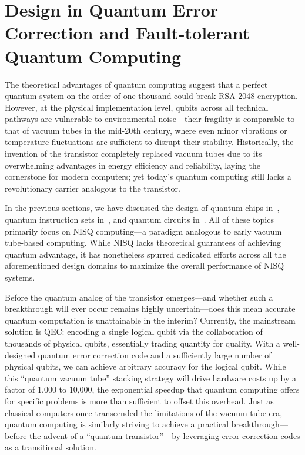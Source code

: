 \documentclass[a4paper,onecolumn,11pt,unpublished]{quantumarticle}
\begin{document}
\section{Design in Quantum Error Correction and Fault-tolerant Quantum Computing}\label{sec:qec}

The theoretical advantages of quantum computing suggest that a perfect quantum system on the order of one thousand could break RSA-2048 encryption. However, at the physical implementation level, qubits across all technical pathways are vulnerable to environmental noise---their fragility is comparable to that of vacuum tubes in the mid-20th century, where even minor vibrations or temperature fluctuations are sufficient to disrupt their stability. Historically, the invention of the transistor completely replaced vacuum tubes due to its overwhelming advantages in energy efficiency and reliability, laying the cornerstone for modern computers; yet today's quantum computing still lacks a revolutionary carrier analogous to the transistor.

In the previous sections, we have discussed the design of quantum chips in~, quantum instruction sets in~, and quantum circuits in~. All of these topics primarily focus on NISQ computing---a paradigm analogous to early vacuum tube-based computing.  While NISQ lacks theoretical guarantees of achieving quantum advantage, it has nonetheless spurred dedicated efforts across all the aforementioned design domains to maximize the overall performance of NISQ systems.

Before the quantum analog of the transistor emerges---and whether such a breakthrough will ever occur remains highly uncertain---does this mean accurate quantum computation is unattainable in the interim? Currently, the mainstream solution is QEC: encoding a single logical qubit via the collaboration of thousands of physical qubits, essentially trading quantity for quality. With a well-designed quantum error correction code and a sufficiently large number of physical qubits, we can achieve arbitrary accuracy for the logical qubit. While this ``quantum vacuum tube'' stacking strategy will drive hardware costs up by a factor of 1,000 to 10,000, the exponential speedup that quantum computing offers for specific problems is more than sufficient to offset this overhead. Just as classical computers once transcended the limitations of the vacuum tube era, quantum computing is similarly striving to achieve a practical breakthrough---before the advent of a ``quantum transistor''---by leveraging error correction codes as a transitional solution.
\end{document}
